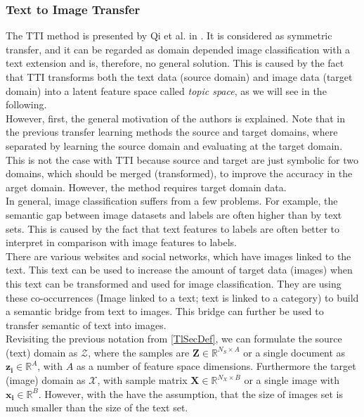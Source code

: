 \subsubsection{Text to Image Transfer}
The \acs{TTI} method is presented by Qi et al. in \cite{Qi.2011}.
It is considered as symmetric transfer, and it can be regarded as domain depended image classification with a text extension and is, therefore, no general solution.\cite[p. 22]{Weiss.2016}
This is caused by the fact that \ac{TTI} transforms both the text data (source domain) and image data (target domain) into a latent feature space called \textit{topic space}, as we will see in the following.\\
However, first, the general motivation of the authors is explained.
Note that in the previous transfer learning methods the source and target domains, where separated by learning the source domain and evaluating at the target domain.
This is not the case with \acs{TTI} because source and target are just symbolic for two domains, which should be merged (transformed), to improve the accuracy in the arget domain.
However, the method requires target domain data.\cite{Qi.2011}\\
In general, image classification suffers from a few problems.
For example, the semantic gap between image datasets and labels are often higher than by text sets.
This is caused by the fact that text features to labels are often better to interpret in comparison with image features to labels.\cite{Qi.2011}\\
There are various websites and social networks, which have images linked to the text.
This text can be used to increase the amount of target data (images) when this text can be transformed and used for image classification.
They are using these co-occurrences (Image linked to a text; text is linked to a category) to build a semantic bridge from text to images.
This bridge can further be used to transfer semantic of text into images.\cite{Qi.2011}\\
Revisiting the previous notation from \ref{TlSecDef}, we can formulate the source (text) domain as $\mathcal{Z}$, where the samples are $\mathbf{Z} \in \mathbb{R}^{N_S\times A}$ or a single document as $\mathbf{z_i}\in \mathbb{R}^A$, with $A$ as a number of feature space dimensions.
Furthermore the target (image) domain as $\mathcal{X}$, with sample matrix $\mathbf{X} \in \mathbb{R}^{N_X\times B}$ or a single image with $\mathbf{x_i}\in\mathbb{R}^B$.
However, with the have the assumption, that the size of images set is much smaller than the size of the text set.\cite{Qi.2011}\\
